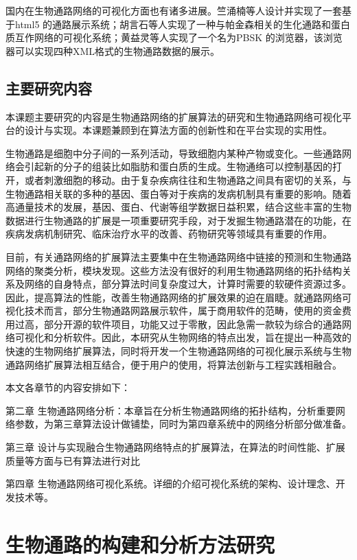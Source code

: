 国内在生物通路网络的可视化方面也有诸多进展。竺涌楠\cite{}等人设计并实现了一套基于html5 的通路展示系统；胡言石\cite{}等人实现了一种与帕金森相关的生化通路和蛋白质互作网络的可视化系统；黄益灵\cite{}等人实现了一个名为PBSK 的浏览器，该浏览器可以实现四种XML格式的生物通路数据的展示。

\section{主要研究内容}
本课题主要研究的内容是生物通路网络的扩展算法的研究和生物通路网络可视化平台的设计与实现。本课题兼顾到在算法方面的创新性和在平台实现的实用性。

生物通路是细胞中分子间的一系列活动，导致细胞内某种产物或变化。一些通路网络会引起新的分子的组装比如脂肪和蛋白质的生成。生物通络可以控制基因的打开，或者刺激细胞的移动。由于复杂疾病往往和生物通路之间具有密切的关系，与生物通路相关联的多种的基因、蛋白等对于疾病的发病机制具有重要的影响。随着高通量技术的发展，基因、蛋白、代谢等组学数据日益积累，结合这些丰富的生物数据进行生物通路的扩展是一项重要研究手段，对于发掘生物通路潜在的功能，在疾病发病机制研究、临床治疗水平的改善、药物研究等领域具有重要的作用。

目前，有关通路网络的扩展算法主要集中在生物通路网络中链接的预测和生物通路网络的聚类分析，模块发现。这些方法没有很好的利用生物通路网络的拓扑结构关系及网络的自身特点，部分算法时间复杂度过大，计算时需要的软硬件资源过多。因此，提高算法的性能，改善生物通路网络的扩展效果的迫在眉睫。就通路网络可视化技术而言，部分生物通路网路展示软件，属于商用软件的范畴，使用的资金费用过高，部分开源的软件项目，功能又过于零散，因此急需一款较为综合的通路网络可视化和分析软件。因此，本研究从生物网络的特点出发，旨在提出一种高效的快速的生物网络扩展算法，同时将开发一个生物通路网络的可视化展示系统与生物通路网络扩展算法相互结合，便于用户的使用，将算法创新与工程实践相融合。

本文各章节的内容安排如下：

第二章 生物通路网络分析：本章旨在分析生物通路网络的拓扑结构，分析重要网络参数，为第三章算法设计做铺垫，同时为第四章系统中的网络分析部分做准备。

第三章 设计与实现融合生物通路网络特点的扩展算法，在算法的时间性能、扩展质量等方面与已有算法进行对比

第四章 生物通路网络可视化系统。详细的介绍可视化系统的架构、设计理念、开发技术等。


\chapter{生物通路的构建和分析方法研究}
